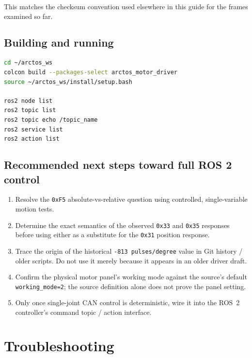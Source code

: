\documentclass[11pt,letterpaper]{article}
\begin{document}
This matches the checksum convention used elsewhere in this guide for the
frames examined so far.

\subsection{Building and running}
\begin{lstlisting}[language=bash]
cd ~/arctos_ws
colcon build --packages-select arctos_motor_driver
source ~/arctos_ws/install/setup.bash

ros2 node list
ros2 topic list
ros2 topic echo /topic_name
ros2 service list
ros2 action list
\end{lstlisting}

\subsection{Recommended next steps toward full ROS 2 control}
\begin{enumerate}
    \item Resolve the \texttt{0xF5} absolute-vs-relative question using controlled,
          single-variable motion tests.
    \item Determine the exact semantics of the observed \texttt{0x33} and
          \texttt{0x35} responses before using either as a substitute for the
          \texttt{0x31} position response.
    \item Trace the origin of the historical \texttt{-813 pulses/degree} value
          in Git history / older scripts.  Do not use it merely because it
          appears in an older driver draft.
    \item Confirm the physical motor panel's working mode against the source's
          default \texttt{working\_mode=2}; the source definition alone does
          not prove the panel setting.
    \item Only once single-joint CAN control is deterministic, wire it into the
          ROS~2 controller's command topic / action interface.
\end{enumerate}

\newpage
\section{Troubleshooting}
\label{sec:troubleshooting}
\end{document}
